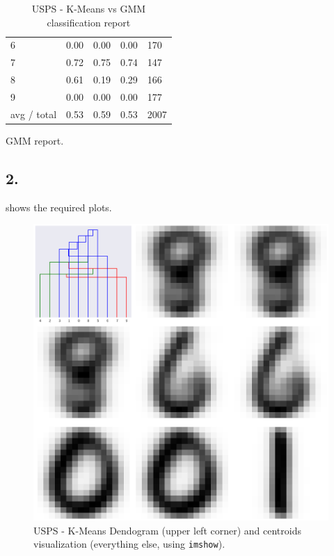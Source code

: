 \documentclass[a4paper,11pt]{article}
\begin{document}
\begin{table}
\begin{subtable}[b]{\textwidth}
\begin{tabularx}{\textwidth}{X|X|X|X|X}
            6           & 0.00      & 0.00   &  0.00    & 170 \\
            7           & 0.72      & 0.75   &  0.74    & 147 \\
            8           & 0.61      & 0.19   &  0.29    & 166 \\
            9           & 0.00      & 0.00   &  0.00    & 177 \\
            \hline
            avg / total & 0.53      & 0.59   &  0.53    & 2007
        \end{tabularx}
        \caption{\small{GMM report.}}
        \label{tab:assignment9_2}
    \end{subtable}
    \caption{\small{USPS - K-Means vs GMM classification report}}
    \label{tab:assignment9}
\end{table}

\subsection*{2.}

 shows the required plots.

\begin{figure}
    \centering
    \includegraphics[scale=0.35]{../images/assignment9_1.png}
    \caption{\small{USPS - K-Means Dendogram (upper left corner) and centroids visualization (everything else, using \texttt{imshow}).}}
    \label{fig:assignment9_2}
\end{figure}
\end{document}
